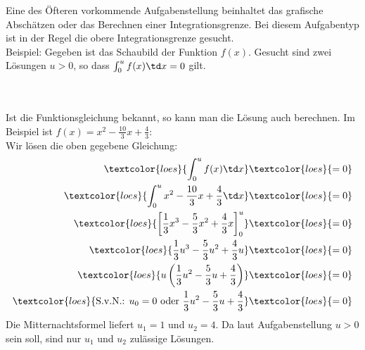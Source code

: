 Eine des Öfteren vorkommende Aufgabenstellung beinhaltet das grafische Abschätzen oder das Berechnen einer Integrationsgrenze. Bei diesem Aufgabentyp ist in der Regel die obere Integrationsgrenze gesucht.\\
Beispiel: Gegeben ist das Schaubild der Funktion \(f(x)\). Gesucht sind zwei Lösungen \(u>0\), so dass \(\int_0^u f(x) \td x=0\) gilt.\\ \\
\begin{minipage}{\textwidth}
\end{minipage}\vspace{\baselineskip}\\
Ist die Funktionsgleichung bekannt, so kann man die Lösung auch berechnen. Im Beispiel ist \(f(x)=x^2-\frac{10}{3}x+\frac{4}{3}\):\\
\textcolor{loes}{Wir lösen die oben gegebene Gleichung:}
\begin{align*}
	\textcolor{loes}{\int_0^u f(x) \td x}&\textcolor{loes}{=0}\\
	\textcolor{loes}{\int_0^u x^2-\frac{10}{3}x+\frac{4}{3} \td x}&\textcolor{loes}{=0}\\
	\textcolor{loes}{\left[\frac{1}{3}x^3-\frac{5}{3}x^2+\frac{4}{3}x \right]_0^u}&\textcolor{loes}{=0}\\
	\textcolor{loes}{\frac{1}{3}u^3-\frac{5}{3}u^2+\frac{4}{3}u}&\textcolor{loes}{=0}\\
	\textcolor{loes}{u\left(\frac{1}{3}u^2-\frac{5}{3}u+\frac{4}{3}\right)}&\textcolor{loes}{=0}\\	
	\textcolor{loes}{\text{S.v.N.: }u_0=0\text{ oder }\frac{1}{3}u^2-\frac{5}{3}u+\frac{4}{3}}&\textcolor{loes}{=0}
\end{align*}
\textcolor{loes}{Die Mitternachtsformel liefert \(u_1=1\) und \(u_2=4\). Da laut Aufgabenstellung \(u>0\) sein soll, sind nur \(u_1\) und \(u_2\) zulässige Lösungen.}
\newpage

